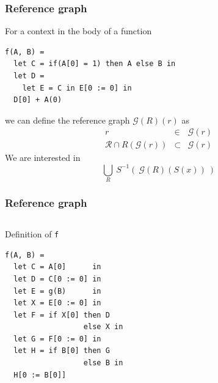 \documentclass{beamer}
\newcommand{\cl}[1]{\texttt{#1}}
\begin{document}
\begin{frame}[fragile]
\frametitle{Reference graph}
For a context in the body of a function
\begin{lstlisting}
f(A, B) =
  let C = if(A[0] = 1) then A else B in
  let D =
    let E = C in E[0 := 0] in
  D[0] + A(0)
\end{lstlisting}
we can define the reference graph $\mathcal{G}(R)(r)$ as
\begin{eqnarray*}
r &\in& \mathcal{G}(r) \\
\mathcal{R} \cap R(\mathcal{G}(r)) &\subset& \mathcal{G}(r)
\end{eqnarray*}
We are interested in
$$ \bigcup_{R} \ S^{-1}( \ \mathcal{G}(R)(S(x)) \ )  $$
\end{frame}


\begin{frame}[fragile]
\frametitle{Reference graph}
\begin{columns}
\begin{column}{0.5\textwidth}
Definition of \cl{f}
\begin{lstlisting}
f(A, B) =
  let C = A[0]      in
  let D = C[0 := 0] in
  let E = g(B)      in
  let X = E[0 := 0] in
  let F = if X[0] then D
                  else X in
  let G = F[0 := 0] in
  let H = if B[0] then G
                  else B in
  H[0 := B[0]]
\end{lstlisting}
\end{column}
\begin{column}{0.5\textwidth}
\end{column}
\end{columns}
\end{frame}
\end{document}
